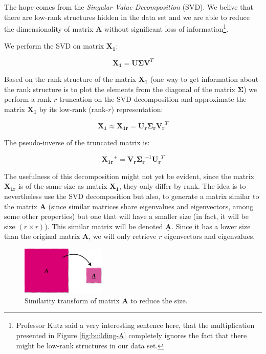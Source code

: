 \documentclass[10pt,twocolumn]{article}
\begin{document}
The hope comes from the \textit{Singular Value Decomposition} (SVD). We belive that there are low-rank structures hidden in the data set and we are able to reduce the dimensionality of matrix $\bm{A}$ without significant loss of information\footnote{Professor Kutz said a very interesting sentence here, that the multiplication presented in Figure \ref{fig:building-A} completely ignores the fact that there might be low-rank structures in our data set.}.

We perform the SVD on matrix $\bm{X_1}$:

\begin{equation} \label{eq:solution}
\bm{X_1} = \bm{U} \bm{\Sigma} \bm{V}^T 
\end{equation}

Based on the rank structure of the matrix $\bm{X_1}$ (one way to get information about the rank structure is to plot the elements from the diagonal of the matrix $\bm{\Sigma}$) we perform a rank-$r$ truncation on the SVD decomposition and approximate the matrix $\bm{X_1}$ by its low-rank (rank-$r$) representation:

\begin{equation} \label{eq:solution-approx}
\bm{X_1} \approx \bm{X_{1r}} = \bm{U_r} \bm{\Sigma_r} \bm{V_r}^T 
\end{equation}

The pseudo-inverse of the truncated matrix is:

\begin{equation} \label{eq:pseudo-inverse}
\bm{X_{1r}}^{+} = \bm{V_r}  \bm{\Sigma_r}^{-1} \bm{U_r}^T
\end{equation}

The usefulness of this decomposition might not yet be evident, since the matrix $\bm{X_{1r}}$ is of the same size as matrix $\bm{X_{1}}$, they only differ by rank. The idea is to nevertheless use the SVD decomposition but also, to generate a matrix similar to the matrix $\bm{A}$ (since similar matrices share eigenvalues and eigenvectors, among some other properties) but one that will have a smaller size (in fact, it will be size $(r \times r)$). This similar matrix will be denoted $\underline{\bm{A}}$. Since it has a lower size than the original matrix $\bm{A}$, we will only retrieve $r$ eigenvectors and eigenvalues.

\begin{figure}
\centering\includegraphics[width=4cm]{similar-matrices.png}
\caption{Similarity transform of matrix $\bm{A}$ to reduce the size.}
\label{fig:similar-matrices}
\end{figure}
\end{document}
